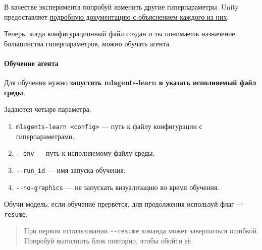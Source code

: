 \documentclass[11pt,a4paper]{article}
\begin{document}


В качестве эксперимента попробуй изменить другие гиперпараметры. Unity предоставляет \href{https://github.com/Unity-Technologies/ml-agents/blob/main/docs/Training-Configuration-File.md}{подробную документацию с объяснением каждого из них}.

Теперь, когда конфигурационный файл создан и ты понимаешь назначение большинства гиперпараметров, можно обучать агента.

\paragraph{Обучение агента}\label{train-the-agent}

Для обучения нужно \textbf{запустить mlagents-learn и указать исполняемый файл среды}.

Задаются четыре параметра:

\begin{enumerate}
\def\labelenumi{\arabic{enumi}.}
\tightlist
\item
  \texttt{mlagents-learn\ \textless{}config\textgreater{}} --- путь к файлу конфигурации с гиперпараметрами.
\item
  \texttt{-\/-env} --- путь к исполняемому файлу среды.
\item
  \texttt{-\/-run\_id} --- имя запуска обучения.
\item
  \texttt{-\/-no-graphics} --- не запускать визуализацию во время обучения.
\end{enumerate}


Обучи модель; если обучение прервётся, для продолжения используй флаг \texttt{-\/-resume}.

\begin{quote}
При первом использовании \texttt{-\/-resume} команда может завершиться ошибкой. Попробуй выполнить блок повторно, чтобы обойти её.
\end{quote}
\end{document}
